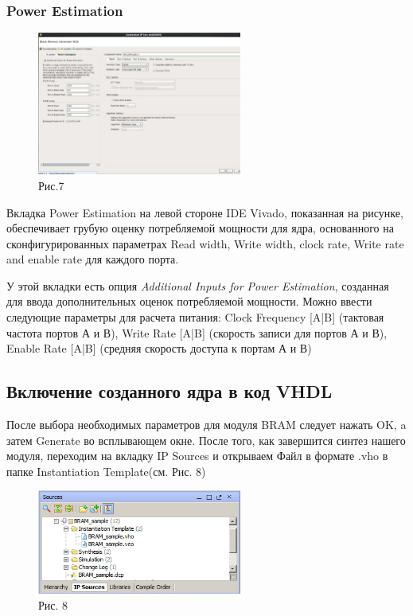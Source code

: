 \subsubsection{Power Estimation}

\begin{figure}[h]
\centering
\includegraphics[width=0.6\textwidth]{7}
\caption{Рис.7}
\label{7_label}
\end{figure}

Вкладка Power Estimation на левой стороне IDE Vivado, показанная на рисунке, обеспечивает грубую оценку потребляемой мощности для ядра, основанного на сконфигурированных параметрах Read width, Write width, clock rate, Write rate and enable rate для каждого порта.
 
У этой вкладки есть опция  \emph {Additional Inputs for Power Estimation}, созданная для ввода дополнительных оценок потребляемой мощности. Можно ввести следующие параметры для расчета питания: Clock Frequency [A|B] (тактовая частота портов А и В), Write Rate [A|B] (скорость записи для портов А и В), Enable Rate [A|B] (средняя скорость доступа к портам А и В)

\subsection{Включение созданного ядра в код VHDL}

После выбора необходимых параметров для модуля BRAM следует нажать OK, a затем Generate во всплывающем окне. После того, как завершится синтез нашего модуля, переходим на вкладку IP Sources и открываем Файл в формате .vho в папке Instantiation Template(см. Рис. 8)

\begin{figure}[h]
\centering
\includegraphics[width=0.6\textwidth]{8}
\caption{Рис. 8}
\label{8_label}
\end{figure}

